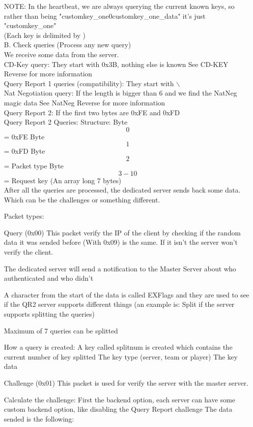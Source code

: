 \documentclass[oneside,titlepage,a4paper]{Definition/retrospy} %
\begin{document}
NOTE: In the heartbeat, we are always querying the current known keys, so
rather than being "customkey\_one\tbs0customkey\_one\_data" it's just "customkey\_one"
\\
(Each key is delimited by )
\\
B. Check queries (Process any new query)
\\
We receive some data from the server.
\\
CD-Key query:
They start with 0x3B, nothing else is known
See CD-KEY Reverse for more information
\\
Query Report 1 queries (compatibility):
They start with $\backslash$
\\
Nat Negotiation query:
If the length is bigger than 6 and we find the NatNeg magic data
See NatNeg Reverse for more information
\\
Query Report 2:
If the first two bytes are 0xFE and 0xFD
\\
Query Report 2 Queries:
Structure:
Byte \[0\] = 0xFE
Byte \[1\] = 0xFD
Byte \[2\] = Packet type
Byte \[3-10\] = Request key (An array long 7 bytes)
\\
After all the queries are processed, the dedicated server sends back some data.
Which can be the challenges or something different.


Packet types:

Query (0x00)
This packet verify the IP of the client by checking if the random data
it was sended before (With 0x09) is the same. If it isn't the server won't
verify the client.

The dedicated server will send a notification to the Master Server about who
authenticated and who didn't

A character from the start of the data is called EXFlags and they are used to see if the QR2
server supports different things (an example is: Split if the server supports splitting the queries)

Maximum of 7 queries can be splitted

How a query is created:
A key called splitnum is created which contains the current number of key splitted
The key type (server, team or player)
The key data

Challenge (0x01)
This packet is used for verify the server with the master server.

Calculate the challenge:
First the backend option, each server can have some custom backend option, like disabling the Query Report challenge
The data sended is the following:
\end{document}
